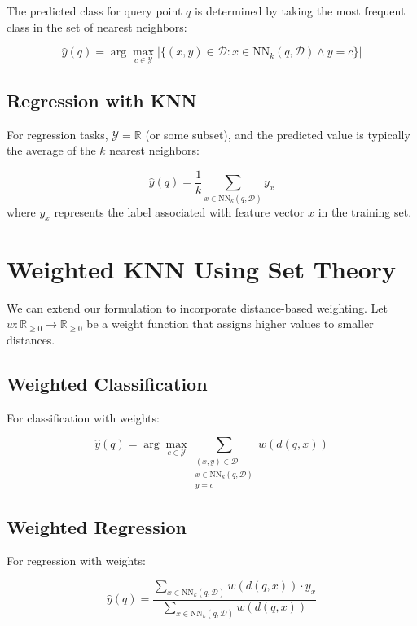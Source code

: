 \documentclass[12pt,a4paper]{article}
\begin{document}
The predicted class for query point $q$ is determined by taking the most frequent class in the set of nearest neighbors:

\begin{equation}
\hat{y}(q) = \arg\max_{c \in \mathcal{Y}} |\{(x, y) \in \mathcal{D} : x \in \text{NN}_k(q, \mathcal{D}) \land y = c\}|
\end{equation}

\subsection{Regression with KNN}
For regression tasks, $\mathcal{Y} = \mathbb{R}$ (or some subset), and the predicted value is typically the average of the $k$ nearest neighbors:

\begin{equation}
\hat{y}(q) = \frac{1}{k} \sum_{x \in \text{NN}_k(q, \mathcal{D})} y_x
\end{equation}
where $y_x$ represents the label associated with feature vector $x$ in the training set.

\section{Weighted KNN Using Set Theory}
We can extend our formulation to incorporate distance-based weighting. Let $w: \mathbb{R}_{\geq 0} \rightarrow \mathbb{R}_{\geq 0}$ be a weight function that assigns higher values to smaller distances.

\subsection{Weighted Classification}
For classification with weights:

\begin{equation}
\hat{y}(q) = \arg\max_{c \in \mathcal{Y}} \sum_{\substack{(x, y) \in \mathcal{D} \\ x \in \text{NN}_k(q, \mathcal{D}) \\ y = c}} w(d(q, x))
\end{equation}

\subsection{Weighted Regression}
For regression with weights:

\begin{equation}
\hat{y}(q) = \frac{\sum_{x \in \text{NN}_k(q, \mathcal{D})} w(d(q, x)) \cdot y_x}{\sum_{x \in \text{NN}_k(q, \mathcal{D})} w(d(q, x))}
\end{equation}
\end{document}
